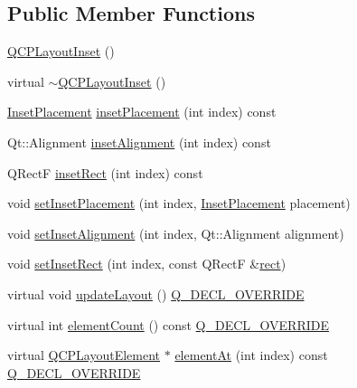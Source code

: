 \subsection*{Public Member Functions}
\begin{DoxyCompactItemize}
\item 
\hyperlink{class_q_c_p_layout_inset_a3ad984f3221735374cc5dee14356a7dd}{Q\+C\+P\+Layout\+Inset} ()
\item 
virtual \hyperlink{class_q_c_p_layout_inset_a7d0e5647b2e92df92abab532441db112}{$\sim$\+Q\+C\+P\+Layout\+Inset} ()
\item 
\hyperlink{class_q_c_p_layout_inset_a8b9e17d9a2768293d2a7d72f5e298192}{Inset\+Placement} \hyperlink{class_q_c_p_layout_inset_a6fcbd74ebbc45bfe64c604b2791aa57f}{inset\+Placement} (int index) const
\item 
Qt\+::\+Alignment \hyperlink{class_q_c_p_layout_inset_a5b33b66f0abbb4a7cc2f8aa6c94cf7f8}{inset\+Alignment} (int index) const
\item 
Q\+RectF \hyperlink{class_q_c_p_layout_inset_ab23099a46af17c31f4c40668f13c9de1}{inset\+Rect} (int index) const
\item 
void \hyperlink{class_q_c_p_layout_inset_a63298830744d5d8c5345511c00fd2144}{set\+Inset\+Placement} (int index, \hyperlink{class_q_c_p_layout_inset_a8b9e17d9a2768293d2a7d72f5e298192}{Inset\+Placement} placement)
\item 
void \hyperlink{class_q_c_p_layout_inset_a62882a4f9ad58bb0f53da12fde022abe}{set\+Inset\+Alignment} (int index, Qt\+::\+Alignment alignment)
\item 
void \hyperlink{class_q_c_p_layout_inset_aa487c8378a6f9533567a2e6430099dc3}{set\+Inset\+Rect} (int index, const Q\+RectF \&\hyperlink{class_q_c_p_layout_element_a208effccfe2cca4a0eaf9393e60f2dd4}{rect})
\item 
virtual void \hyperlink{class_q_c_p_layout_inset_a493526b922ea66a75c45ef1842446988}{update\+Layout} () \hyperlink{qcustomplot_8h_a42cc5eaeb25b85f8b52d2a4b94c56f55}{Q\+\_\+\+D\+E\+C\+L\+\_\+\+O\+V\+E\+R\+R\+I\+DE}
\item 
virtual int \hyperlink{class_q_c_p_layout_inset_a7f5aa4d48a2e844cfe6dd7ed8f0861df}{element\+Count} () const \hyperlink{qcustomplot_8h_a42cc5eaeb25b85f8b52d2a4b94c56f55}{Q\+\_\+\+D\+E\+C\+L\+\_\+\+O\+V\+E\+R\+R\+I\+DE}
\item 
virtual \hyperlink{class_q_c_p_layout_element}{Q\+C\+P\+Layout\+Element} $\ast$ \hyperlink{class_q_c_p_layout_inset_a881ca205605bae9c034733b808f93a02}{element\+At} (int index) const \hyperlink{qcustomplot_8h_a42cc5eaeb25b85f8b52d2a4b94c56f55}{Q\+\_\+\+D\+E\+C\+L\+\_\+\+O\+V\+E\+R\+R\+I\+DE}

\end{DoxyCompactItemize}
